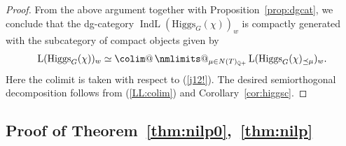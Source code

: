 \documentclass [11pt,oneside,a4paper,mathscr]{amsart}
\makeatletter
\theoremstyle{definition}
\newcommand{\LL}{\operatorname{L}}
\newcommand{\IndL}{\operatorname{IndL}}
\newcommand{\Hig}{\mathrm{Higgs}}
\newcommand{\colim@}[2]{%
  \vtop{\m@th\ialign{##\cr
    \hfil$#1\operator@font colim$\hfil\cr
    \noalign{\nointerlineskip\kern1.5\ex@}#2\cr
    \noalign{\nointerlineskip\kern-\ex@}\cr}}%
}
\newcommand{\colim}{%
  \mathop{\mathpalette\colim@{}}\nmlimits@
}
\makeatother
\begin{document}
\begin{proof}
From the above argument together with Proposition~\ref{prop:dgcat}, 
    we conclude that the dg-category $\IndL(\Hig_G(\chi))_w$ is compactly generated 
with the subcategory of compact objects given by
\begin{align}\label{LL:colim}
\LL(\Hig_G(\chi))_w \simeq \colim_{\mu \in N(T)_{\mathbb{Q}+}} \LL(\Hig_G(\chi)_{\preceq \mu})_w. 
\end{align}
Here the colimit is taken with respect to (\ref{j12!}). 
The desired semiorthogonal decomposition follows from (\ref{LL:colim}) and Corollary~\ref{cor:higgsc}. 
\end{proof}

\subsection{Proof of Theorem~\ref{thm:nilp0},~\ref{thm:nilp}}\label{subsec:pfnil}
\end{document}
